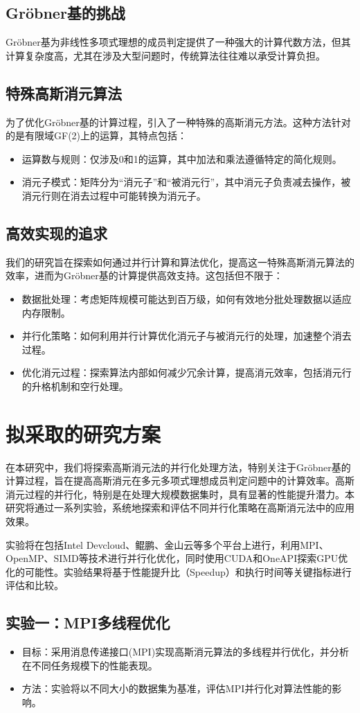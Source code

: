 \documentclass[UTF8,a4paper,10pt]{ctexart}
\begin{document}
\subsection{Gröbner基的挑战}
Gröbner基为非线性多项式理想的成员判定提供了一种强大的计算代数方法，但其计算复杂度高，尤其在涉及大型问题时，传统算法往往难以承受计算负担。
\subsection{特殊高斯消元算法}
为了优化Gröbner基的计算过程，引入了一种特殊的高斯消元方法。这种方法针对的是有限域GF(2)上的运算，其特点包括：
\begin{itemize}
  \item 运算数与规则：仅涉及0和1的运算，其中加法和乘法遵循特定的简化规则。
  \item 消元子模式：矩阵分为“消元子”和“被消元行”，其中消元子负责减去操作，被消元行则在消去过程中可能转换为消元子。
\end{itemize}
\subsection{高效实现的追求}
我们的研究旨在探索如何通过并行计算和算法优化，提高这一特殊高斯消元算法的效率，进而为Gröbner基的计算提供高效支持。这包括但不限于：
\begin{itemize}
  \item 数据批处理：考虑矩阵规模可能达到百万级，如何有效地分批处理数据以适应内存限制。
  \item 并行化策略：如何利用并行计算优化消元子与被消元行的处理，加速整个消去过程。
  \item 优化消元过程：探索算法内部如何减少冗余计算，提高消元效率，包括消元行的升格机制和空行处理。
\end{itemize}
\section{拟采取的研究方案}
在本研究中，我们将探索高斯消元法的并行化处理方法，特别关注于Gröbner基的计算过程，旨在提高高斯消元在多元多项式理想成员判定问题中的计算效率。高斯消元过程的并行化，特别是在处理大规模数据集时，具有显著的性能提升潜力。本研究将通过一系列实验，系统地探索和评估不同并行化策略在高斯消元法中的应用效果。

实验将在包括Intel Devcloud、鲲鹏、金山云等多个平台上进行，利用MPI、OpenMP、SIMD等技术进行并行化优化，同时使用CUDA和OneAPI探索GPU优化的可能性。实验结果将基于性能提升比（Speedup）和执行时间等关键指标进行评估和比较。
\subsection{实验一：MPI多线程优化}
\begin{itemize}
  \item 目标：采用消息传递接口(MPI)实现高斯消元算法的多线程并行优化，并分析在不同任务规模下的性能表现。
  \item 方法：实验将以不同大小的数据集为基准，评估MPI并行化对算法性能的影响。
\end{itemize}
\end{document}
